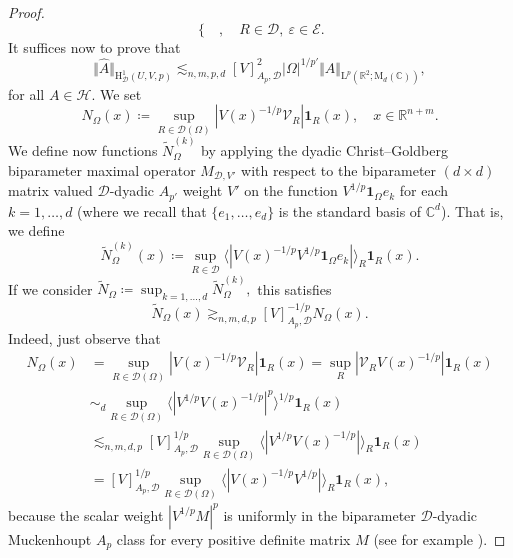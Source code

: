 \documentclass{article}
\theoremstyle{definition}
\theoremstyle{remark}
\numberwithin{equation}{section}
\newcommand{\cE}{\mathcal{E}}
\newcommand{\cH}{\mathcal{H}}
\newcommand{\cV}{\mathcal{V}}
\newcommand{\bfD}{\bm{\mathcal{D}}}
\newcommand{\e}{\varepsilon}
\newcommand{\reals}{\mathbb{R}}
\newcommand{\complex}{\mathbb{C}}
\newcommand{\Lp}[1]{\mathrm{L}^{#1}}
\newcommand{\1}{\mathbf{1}}
\begin{document}
\begin{proof}
\begin{equation*}
\begin{cases}
            \end{cases}
            ,\quad R\in\bfD,~\e\in\cE.
        \end{equation*}
        It suffices now to prove that
        \begin{equation*}
            \Vert\hat{A}\Vert_{\mathrm{H}^1_{\bfD}(U,V,p)}\lesssim_{n,m,p,d}[V]_{A_{p},\bfD}^{2}|\Omega|^{1/p'}\Vert A\Vert_{\Lp{p}(\reals^2;\mathrm{M}_{d}(\complex))},
        \end{equation*}
        for all $A\in\cH.$ We set
        \begin{equation*}
            N_{\Omega}(x)\coloneq \sup_{R\in\bfD(\Omega)}|V(x)^{-1/p}\cV_{R}|\1_{R}(x),\quad x\in\reals^{n+m}.
        \end{equation*}
        We define now functions $\widetilde{N}_\Omega^{(k)}$ by applying
        the dyadic Christ--Goldberg biparameter maximal operator $M_{\bfD,V'}$ with respect to the biparameter $(d\times d)$ matrix valued $\bfD$-dyadic $A_{p'}$ weight $V'$ on the function $V^{1/p}\1_{\Omega}e_k$ for each $k=1,\ldots,d$ (where we recall that $\{e_1,\ldots,e_d\}$ is the standard basis of $\complex^d$).
        That is, we define
        \begin{equation*}
            \widetilde{N}_\Omega^{(k)}(x) \coloneq \sup_{R\in\bfD} \langle|V(x)^{-1/p}V^{1/p}\1_\Omega e_k|\rangle_R \1_R(x).
        \end{equation*}
        If we consider $\widetilde{N}_\Omega \coloneq \sup_{k=1,\ldots,d} \widetilde{N}_\Omega^{(k)},$ this satisfies
        \begin{equation*}
            \widetilde{N}_\Omega(x) \gtrsim_{n,m,d,p} [V]_{A_p,\bfD}^{-1/p} N_\Omega(x).
        \end{equation*}
        Indeed, just observe that
        \begin{align*}
            N_{\Omega}(x)&=\sup_{R\in\bfD(\Omega)}|V(x)^{-1/p}\cV_{R}|\1_{R}(x)=\sup_{R}|\cV_{R}V(x)^{-1/p}|\1_{R}(x)\\
            &\sim_{d}\sup_{R\in\bfD(\Omega)}\langle|V^{1/p}V(x)^{-1/p}|^{p}\rangle^{1/p}\1_{R}(x)\\
            &\lesssim_{n,m,d,p}[V]_{A_p,\bfD}^{1/p} \sup_{R\in\bfD(\Omega)} \langle|V^{1/p}V(x)^{-1/p}|\rangle_R \1_R(x)\\
            &=[V]_{A_p,\bfD}^{1/p} \sup_{R\in\bfD(\Omega)} \langle|V(x)^{-1/p}V^{1/p}|\rangle_R \1_R(x),
        \end{align*}
        because the scalar weight $|V^{1/p}M|^{p}$ is uniformly in the biparameter $\bfD$-dyadic Muckenhoupt $A_p$ class for every positive definite matrix $M$ (see for example \cite[Lemma 3.4]{DKPS2024}).

\end{proof}
\end{document}
